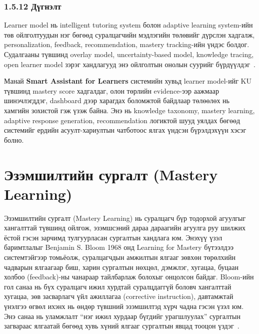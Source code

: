 \documentclass[12pt,A4]{report}
\newcommand{\eng}[1]{#1}
\begin{document}
\subsubsection{1.5.12 Дүгнэлт}

Learner model нь intelligent tutoring system болон adaptive learning system-ийн төв ойлголтуудын нэг бөгөөд суралцагчийн мэдлэгийн төлөвийг дүрслэн хадгалж, personalization, feedback, recommendation, mastery tracking-ийн үндэс болдог. Судалгааны түвшинд overlay model, uncertainty-based model, knowledge tracing, open learner model зэрэг хандлагууд энэ ойлголтын онолын суурийг бүрдүүлдэг~\cite{brusilovsky2007,desmarais2012,corbett1994,bull2010}.

Манай \textbf{Smart Assistant for Learners} системийн хувьд learner model-ийг KU түвшинд mastery score хадгалдаг, олон төрлийн evidence-ээр аажмаар шинэчлэгддэг, dashboard дээр харагдах боломжтой байдлаар төлөөлөх нь хамгийн зохистой гэж үзэж байна. Энэ нь knowledge taxonomy, mastery learning, adaptive response generation, recommendation логиктой шууд уялдах бөгөөд системийг ердийн асуулт-хариултын чатботоос ялгах үндсэн бүрэлдэхүүн хэсэг болно.



\section{Эзэмшилтийн сургалт (Mastery Learning)}

Эзэмшилтийн сургалт (\eng{Mastery Learning}) нь суралцагч бүр тодорхой агуулгыг хангалттай түвшинд ойлгож, эзэмшсэний дараа дараагийн агуулга руу шилжих ёстой гэсэн зарчимд тулгуурласан сургалтын хандлага юм. Энэхүү үзэл баримтлалыг Benjamin S. Bloom 1968 онд \eng{Learning for Mastery} бүтээлдээ системтэйгээр томьёолж, суралцагчдын амжилтын ялгааг зөвхөн төрөлхийн чадварын ялгаагаар биш, харин сургалтын нөхцөл, дэмжлэг, хугацаа, буцаан холбоо (\eng{feedback})-ны чанараар тайлбарлаж болохыг онцолсон байдаг. Bloom-ийн гол санаа нь бүх суралцагч ижил хурдтай суралцдаггүй боловч хангалттай хугацаа, зөв засварлагч үйл ажиллагаа (\eng{corrective instruction}), давтамжтай үнэлгээ өгвөл ихэнх нь өндөр түвшний эзэмшилтэд хүрч чадна гэсэн үзэл юм. Энэ санаа нь уламжлалт ``нэг ижил хурдаар бүгдийг урагшлуулах'' сургалтын загвараас ялгаатай бөгөөд хувь хүний ялгааг сургалтын явцад тооцон үздэг~\cite{bloom1968}.
\end{document}
